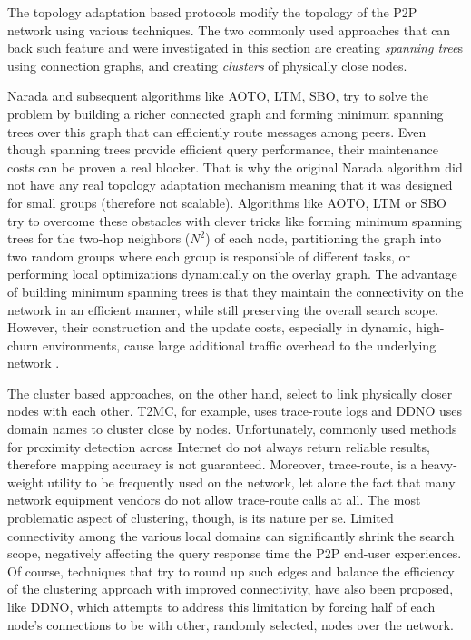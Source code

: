 The topology adaptation based protocols modify the topology of the P2P network
using various techniques. The two commonly used approaches that can
back such feature and were investigated in this section are creating
\emph{spanning tree}s using connection graphs, and creating \emph{clusters} of
physically close nodes.

Narada and subsequent algorithms like AOTO, LTM, SBO, try to solve the problem
by building a richer connected graph and forming minimum spanning trees over
this graph that can efficiently route messages among peers. Even though spanning
trees provide efficient query performance, their maintenance costs can be
proven a real blocker. That is why the original Narada algorithm did not have
any real topology adaptation mechanism meaning that it was designed for small
groups (therefore not scalable). Algorithms like AOTO, LTM or SBO try to
overcome these obstacles with clever tricks like forming minimum spanning trees
for the two-hop neighbors ($N^2$) of each node, partitioning the graph into two
random groups where each group is responsible of different tasks, or performing
local optimizations dynamically on the overlay graph. The advantage of building
minimum spanning trees is that they maintain the connectivity on the network in
an efficient manner, while still preserving the overall search scope. However,
their construction and the update costs, especially in dynamic, high-churn
environments, cause large additional traffic overhead to the underlying
network \cite{CRZ2000,CRSZ2001,CRSZ2002}.

The cluster based approaches, on the other hand, select to link physically
closer nodes with each other. T2MC, for example, uses trace-route logs and DDNO
uses domain names to cluster close by nodes. Unfortunately, commonly used
methods for proximity detection across Internet do not always return
reliable results, therefore mapping accuracy is not guaranteed. Moreover,
trace-route, is a heavy-weight utility to be frequently used on the
network, let alone the fact that many network equipment vendors do not allow
trace-route calls at all. The most problematic aspect of clustering, though, is
its nature per se. Limited connectivity among the various local domains can
significantly shrink the search scope, negatively affecting the query response
time the P2P end-user experiences. Of course, techniques that try to round up
such edges and balance the efficiency of the clustering approach with improved
connectivity, have also been proposed, like DDNO, which attempts to address this
limitation by forcing half of each node's connections to be with other, randomly
selected, nodes over the network.


